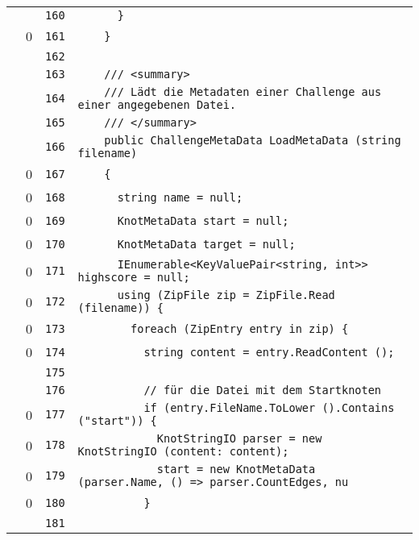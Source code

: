 \documentclass[a4paper,10pt]{article}
\begin{document}
\begin{longtable}[l]{lrrl}
\cellcolor{gray} &  & \verb~160~ & \verb~      }~\\
\cellcolor{red} & 0 & \verb~161~ & \verb~    }~\\
\cellcolor{gray} &  & \verb~162~ & \verb~~\\
\cellcolor{gray} &  & \verb~163~ & \verb~    /// <summary>~\\
\cellcolor{gray} &  & \verb~164~ & \verb~    /// Lädt die Metadaten einer Challenge aus einer angegebenen Datei.~\\
\cellcolor{gray} &  & \verb~165~ & \verb~    /// </summary>~\\
\cellcolor{gray} &  & \verb~166~ & \verb~    public ChallengeMetaData LoadMetaData (string filename)~\\
\cellcolor{red} & 0 & \verb~167~ & \verb~    {~\\
\cellcolor{red} & 0 & \verb~168~ & \verb~      string name = null;~\\
\cellcolor{red} & 0 & \verb~169~ & \verb~      KnotMetaData start = null;~\\
\cellcolor{red} & 0 & \verb~170~ & \verb~      KnotMetaData target = null;~\\
\cellcolor{red} & 0 & \verb~171~ & \verb~      IEnumerable<KeyValuePair<string, int>> highscore = null;~\\
\cellcolor{red} & 0 & \verb~172~ & \verb~      using (ZipFile zip = ZipFile.Read (filename)) {~\\
\cellcolor{red} & 0 & \verb~173~ & \verb~        foreach (ZipEntry entry in zip) {~\\
\cellcolor{red} & 0 & \verb~174~ & \verb~          string content = entry.ReadContent ();~\\
\cellcolor{gray} &  & \verb~175~ & \verb~~\\
\cellcolor{gray} &  & \verb~176~ & \verb~          // für die Datei mit dem Startknoten~\\
\cellcolor{red} & 0 & \verb~177~ & \verb~          if (entry.FileName.ToLower ().Contains ("start")) {~\\
\cellcolor{red} & 0 & \verb~178~ & \verb~            KnotStringIO parser = new KnotStringIO (content: content);~\\
\cellcolor{red} & 0 & \verb~179~ & \verb~            start = new KnotMetaData (parser.Name, () => parser.CountEdges, nu~\\
\cellcolor{red} & 0 & \verb~180~ & \verb~          }~\\
\cellcolor{gray} &  & \verb~181~ & \verb~~\\

\end{longtable}
\end{document}
